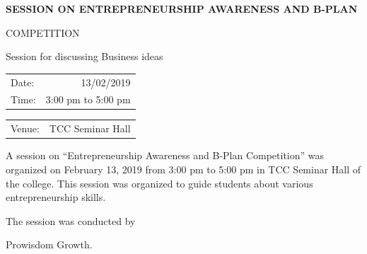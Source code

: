 \documentclass[12pt, a4 paper]{article}
\begin{document}

\begin{center}
\Huge \bfseries \ttfamily SESSION ON ENTREPRENEURSHIP AWARENESS AND B-PLAN

COMPETITION
\end{center}

\begin{center}
\large Session for discussing Business ideas
\end{center}

\begin{center}
\begin{multicols}{2}
\begin{tabular}{l r}
Date: & 13/02/2019\\ %
Time: & 3:00 pm to 5:00 pm \\ %
\end{tabular}
\columnbreak
\begin{tabular}{l r}
Venue: & TCC Seminar Hall \\ %
\end{tabular}
\end{multicols}


\begin{Large}
\begin{multicols}{2}
A session on “Entrepreneurship Awareness and B-Plan Competition” was organized on February 13, 2019 from 3:00 pm to 5:00 pm in TCC Seminar Hall of the college. This session was organized to guide students about various entrepreneurship skills.

\columnbreak
\end{multicols}

\begin{multicols}{2}


\columnbreak
The  session  was  conducted  by

Prowisdom Growth.

\end{multicols}


\end{Large}
\end{center}
\end{document}
